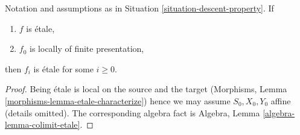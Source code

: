 \begin{lemma}
\label{lemma-descend-etale}
Notation and assumptions as in Situation \ref{situation-descent-property}.
If
\begin{enumerate}
\item $f$ is \'etale,
\item $f_0$ is locally of finite presentation,
\end{enumerate}
then $f_i$ is \'etale for some $i \geq 0$.
\end{lemma}

\begin{proof}
Being \'etale is local on the source and the target (Morphisms,
Lemma \ref{morphisms-lemma-etale-characterize}) hence we may assume
$S_0, X_0, Y_0$ affine (details omitted). The corresponding algebra fact is
Algebra, Lemma \ref{algebra-lemma-colimit-etale}.
\end{proof}
